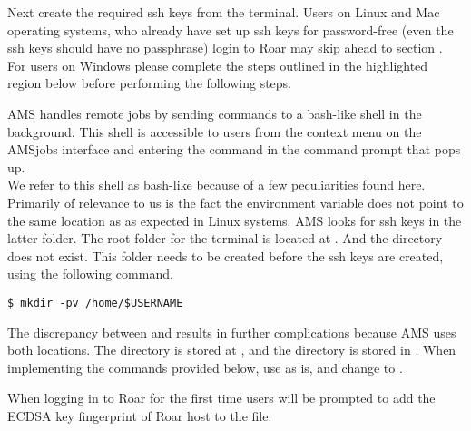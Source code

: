 Next create the required ssh keys from the terminal. 
Users on Linux and Mac operating systems, who already have set up ssh keys for password-free (even the ssh keys should have no passphrase) login to Roar may skip ahead to section . 
For users on Windows please complete the steps outlined in the highlighted region below before performing the following steps.\\
\vspace{1ex}
\begin{tcolorbox}[colback=pantone!10!white,colframe=pantone,title=\textit{For Windows local machines only, perform this step first.}]
    AMS handles remote jobs by sending commands to a bash-like shell in the background. 
    This shell is accessible to users from the context menu  on the AMSjobs interface and entering the command  in the command prompt that pops up.\\

    We refer to this shell as bash-like because of a few peculiarities found here. 
    Primarily of relevance to us is the fact the  environment variable does not point to the same location as  as expected in Linux systems. 
    AMS looks for ssh keys in the latter folder. 
    The root folder for the terminal is located at . 
    And the directory  does not exist. 
    This folder needs to be created before the ssh keys are created, using the following command.
    \begin{lstlisting}[backgroundcolor=\color{inboxgray},
        frame=single,
        gobble=8
        ]
        $ mkdir -pv /home/$USERNAME
    \end{lstlisting}
    The discrepancy between  and  results in further complications because AMS uses both locations. 
    The  directory is stored at , and the  directory is stored in .
    When implementing the commands provided below, use  as is, and change  to .
\end{tcolorbox}
When logging in to Roar for the first time users will be prompted to add the ECDSA key fingerprint of Roar host to the  file. 
